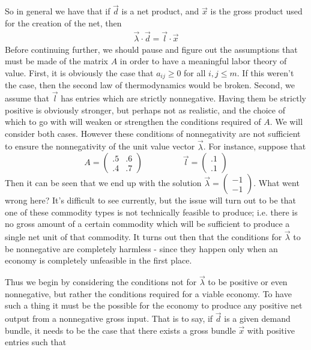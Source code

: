 So in general we have that if $\vec{d}$ is a net product, and $\vec{x}$ is the gross product used for the creation of the net, then 
\begin{align}
	\vec{\lambda}\cdot \vec{d} = \vec{l} \cdot \vec{x}
\end{align}
Before continuing further, we should pause and figure out the assumptions that must be made of the matrix $A$ in order to have a meaningful labor theory of value. First, it is obviously the case that $a_{ij} \geq 0$ for all $i,j \leq m$. If this weren't the case, then the second law of thermodynamics would be broken. Second, we assume that $\vec{l}$ has entries which are strictly nonnegative. Having them be strictly positive is obviously stronger, but perhaps not as realistic, and the choice of which to go with will weaken or strengthen the conditions required of $A$. We will consider both cases. However these conditions of nonnegativity are not sufficient to ensure the nonnegativity of the unit value vector $\vec{\lambda}$. For instance, suppose that 
\[ A = \begin{pmatrix} .5 & .6 \\ .4 & .7 \end{pmatrix} \hspace{2cm} \vec{l} = \begin{pmatrix} .1 \\ .1 \end{pmatrix} \]
Then it can be seen that we end up with the solution $\vec{\lambda} = \begin{pmatrix} -1 \\ -1 \end{pmatrix}$. What went wrong here? It's difficult to see currently, but the issue will turn out to be that one of these commodity types is not technically feasible to produce; i.e. there is no gross amount of a certain commodity which will be sufficient to produce a single net unit of that commodity. It turns out then that the conditions for $\vec{\lambda}$ to be nonnegative are completely harmless - since they happen only when an economy is completely unfeasible in the first place. \par 
 Thus we begin by considering the conditions not for $\vec{\lambda}$ to be positive or even nonnegative, but rather the conditions required for a viable economy. To have such a thing it must be the possible for the economy to produce any positive net output from a nonnegative gross input. That is to say, if $\vec{d}$ is a given demand bundle, it needs to be the case that there exists a gross bundle $\vec{x}$ with positive entries such that 
